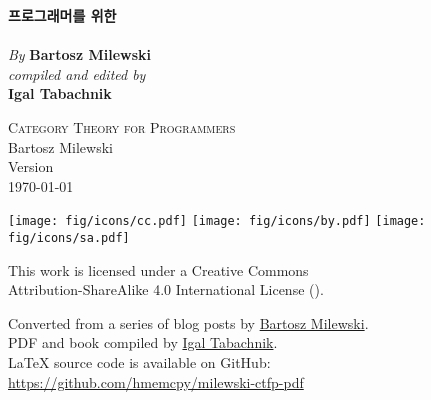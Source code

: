 

\thispagestyle{empty}

\vspace*{80pt}

\begin{raggedleft}
\fontsize{24pt}{24pt}\selectfont
\textbf{프로그래머를 위한 \\ \trCategoryTheory}\\
\ifdefined{}
\fi
\vspace*{1cm}
\fontsize{16pt}{18pt}\selectfont \textit{By } \textbf{Bartosz Milewski}\\
\vspace{1cm}
\fontsize{12pt}{14pt}\selectfont \textit{compiled and edited by}\\ \textbf{Igal Tabachnik}\\

\end{raggedleft}


\newpage

\vspace*{0.3\textheight}
\thispagestyle{empty}

\begin{small}
\begin{center}

\textsc{Category Theory for Programmers}\\

\vspace{1.0em}
\noindent
Bartosz Milewski\\

\vspace{1.26em}
\noindent
Version \texttt{\OPTversion}\\\today


\vspace{1.6em}
\noindent
\texttt{[image: fig/icons/cc.pdf]}
\texttt{[image: fig/icons/by.pdf]}
\texttt{[image: fig/icons/sa.pdf]}

\vspace{0.4em}
\noindent
This work is licensed under a Creative Commons\\
Attribution-ShareAlike 4.0 International License
(\href{http://creativecommons.org/licenses/by-sa/4.0/}{}).

\vspace{1.26em}
\noindent
Converted from a series of blog posts by \href{https://bartoszmilewski.com/2014/10/28/category-theory-for-programmers-the-preface/}{Bartosz Milewski}.\\
PDF and book compiled by \href{https://hmemcpy.com}{Igal Tabachnik}.\\
\vspace{1.26em}
\noindent
\LaTeX{} source code is available on GitHub: \href{https://github.com/hmemcpy/milewski-ctfp-pdf}{https://github.com/hmemcpy/milewski-ctfp-pdf} 
\end{center}
\end{small}